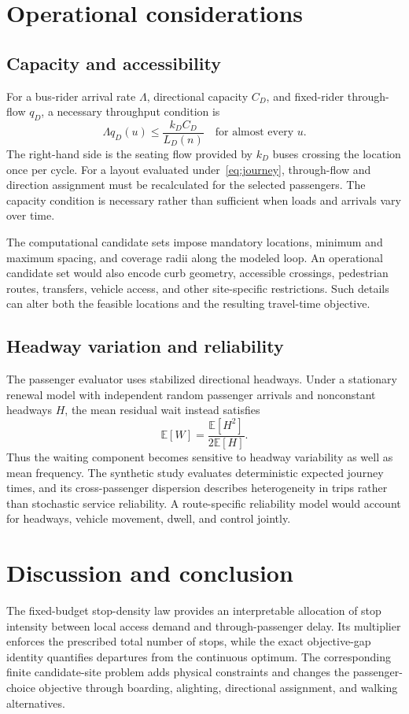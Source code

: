 \documentclass[11pt]{article}
\theoremstyle{remark}\newtheorem{remark}[theorem]{Remark}
\newcommand{\E}{\mathbb E}
\begin{document}
\section{Operational considerations}\label{sec:limits}
\subsection{Capacity and accessibility}
For a bus-rider arrival rate $\Lambda$, directional capacity $C_D$, and fixed-rider through-flow $q_D$, a necessary throughput condition is
\begin{equation}
\Lambda q_D(u)\leq\frac{k_D C_D}{L_D(n)}\quad\text{for almost every }u.\label{eq:capacity}
\end{equation}
The right-hand side is the seating flow provided by $k_D$ buses crossing the location once per cycle. For a layout evaluated under~\eqref{eq:journey}, through-flow and direction assignment must be recalculated for the selected passengers. The capacity condition is necessary rather than sufficient when loads and arrivals vary over time.

The computational candidate sets impose mandatory locations, minimum and maximum spacing, and coverage radii along the modeled loop. An operational candidate set would also encode curb geometry, accessible crossings, pedestrian routes, transfers, vehicle access, and other site-specific restrictions. Such details can alter both the feasible locations and the resulting travel-time objective.

\subsection{Headway variation and reliability}
The passenger evaluator uses stabilized directional headways. Under a stationary renewal model with independent random passenger arrivals and nonconstant headways $H$, the mean residual wait instead satisfies
\begin{equation}
\E[W]=\frac{\E[H^2]}{2\E[H]}.
\end{equation}
Thus the waiting component becomes sensitive to headway variability as well as mean frequency. The synthetic study evaluates deterministic expected journey times, and its cross-passenger dispersion describes heterogeneity in trips rather than stochastic service reliability. A route-specific reliability model would account for headways, vehicle movement, dwell, and control jointly.

\section{Discussion and conclusion}
The fixed-budget stop-density law provides an interpretable allocation of stop intensity between local access demand and through-passenger delay. Its multiplier enforces the prescribed total number of stops, while the exact objective-gap identity quantifies departures from the continuous optimum. The corresponding finite candidate-site problem adds physical constraints and changes the passenger-choice objective through boarding, alighting, directional assignment, and walking alternatives.
\end{document}
